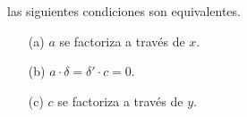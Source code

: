\documentclass[preview]{standalone}
\begin{document}
\begin{center}
las siguientes condiciones son equivalentes. \begin{itemize} \item[(a)] $a$ se factoriza a través de $x$. \item[(b)] $a\cdot\delta = \delta'\cdot c = 0$. \item[(c)] $c$ se factoriza a través de $y$. \end{itemize}
\end{center}
\end{document}
